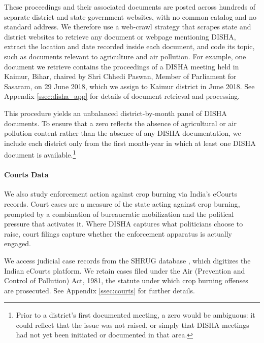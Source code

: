 \documentclass[12pt]{article}
\begin{document}
These proceedings and their associated documents are posted across hundreds of separate district and state government websites, with no common catalog and no standard address. We therefore use a web-crawl strategy that scrapes state and district websites to retrieve any document or webpage mentioning DISHA, extract the location and date recorded inside each document, and code its topic, such as documents relevant to agriculture and air pollution. For example, one document we retrieve contains the proceedings of a DISHA meeting held in Kaimur, Bihar, chaired by Shri Chhedi Paswan, Member of Parliament for Sasaram, on 29 June 2018, which we assign to Kaimur district in June 2018. See Appendix \ref{ssec:disha_app} for details of document retrieval and processing.

This procedure yields an unbalanced district-by-month panel of DISHA documents. To ensure that a zero reflects the absence of agricultural or air pollution content rather than the absence of any DISHA documentation, we include each district only from the first month-year in which at least one DISHA document is available.\footnote{Prior to a district's first documented meeting, a zero would be ambiguous: it could reflect that the issue was not raised, or simply that DISHA meetings had not yet been initiated or documented in that area.}


\paragraph{Courts Data} 
We also study enforcement action against crop burning via India's eCourts records. Court cases are a measure of the state acting against crop burning, prompted by a combination of bureaucratic mobilization and the political pressure that activates it. Where DISHA captures what politicians choose to raise, court filings capture whether the enforcement apparatus is actually engaged. 

We access judicial case records from the SHRUG 
database \citep{aabbcdgns2025bias}, which digitizes the Indian eCourts platform. We retain cases filed under the Air (Prevention and Control of Pollution) Act, 1981, the statute under which crop burning offenses are prosecuted.  See Appendix \ref{ssec:courts} for further details.
\end{document}
